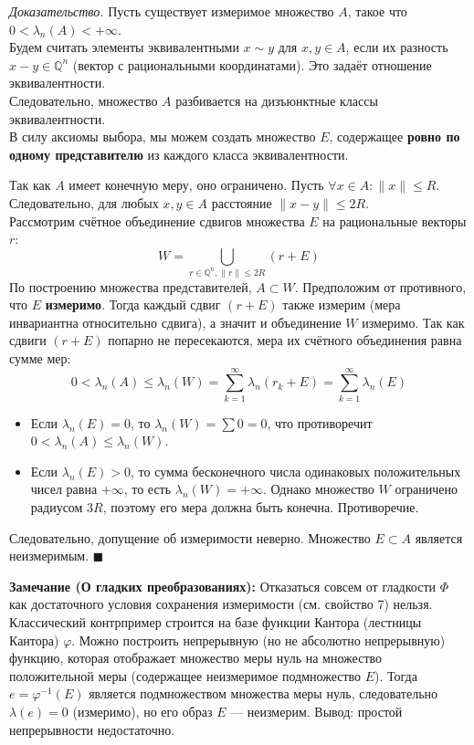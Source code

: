 \documentclass[12pt,a4paper]{article}
\newenvironment{Proof}[1][Доказательство]{\vspace{0.5em}\noindent\textit{#1.}\hspace{0.5em}\ignorespaces}{\hfill$\blacksquare$\vspace{1em}}
\begin{document}
\begin{Proof}
Пусть существует измеримое множество $A$, такое что $0 < \lambda_n(A) < +\infty$. \\
Будем считать элементы эквивалентными $x \sim y$ для $x, y \in A$, если их разность $x - y \in \mathbb{Q}^n$ (вектор с рациональными координатами). Это задаёт отношение эквивалентности. \\
Следовательно, множество $A$ разбивается на дизъюнктные классы эквивалентности. \\
В силу аксиомы выбора, мы можем создать множество $E$, содержащее \textbf{ровно по одному представителю} из каждого класса эквивалентности.

Так как $A$ имеет конечную меру, оно ограничено. Пусть $\forall x \in A : \|x\| \le R$. \\
Следовательно, для любых $x, y \in A$ расстояние $\|x - y\| \le 2R$. \\
Рассмотрим счётное объединение сдвигов множества $E$ на рациональные векторы $r$:
$$ W = \bigcup\limits_{r \in \mathbb{Q}^n, \|r\| \le 2R} (r + E) $$
По построению множества представителей, $A \subset W$. 
Предположим от противного, что $E$ \textbf{измеримо}. Тогда каждый сдвиг $(r + E)$ также измерим (мера инвариантна относительно сдвига), а значит и объединение $W$ измеримо.
Так как сдвиги $(r + E)$ попарно не пересекаются, мера их счётного объединения равна сумме мер:
$$ 0 < \lambda_n(A) \le \lambda_n(W) = \sum\limits_{k=1}^{\infty} \lambda_n(r_k + E) = \sum\limits_{k=1}^{\infty} \lambda_n(E) $$
\begin{itemize}
    \item Если $\lambda_n(E) = 0$, то $\lambda_n(W) = \sum 0 = 0$, что противоречит $0 < \lambda_n(A) \le \lambda_n(W)$.
    \item Если $\lambda_n(E) > 0$, то сумма бесконечного числа одинаковых положительных чисел равна $+\infty$, то есть $\lambda_n(W) = +\infty$. Однако множество $W$ ограничено радиусом $3R$, поэтому его мера должна быть конечна. Противоречие.
\end{itemize}
Следовательно, допущение об измеримости неверно. Множество $E \subset A$ является неизмеримым.
\end{Proof}

\noindent \textbf{Замечание (О гладких преобразованиях):} Отказаться совсем от гладкости $\Phi$ как достаточного условия сохранения измеримости (см. свойство 7) нельзя. Классический контрпример строится на базе функции Кантора (лестницы Кантора) $\varphi$. Можно построить непрерывную (но не абсолютно непрерывную) функцию, которая отображает множество меры нуль на множество положительной меры (содержащее неизмеримое подмножество $E$). Тогда $e = \varphi^{-1}(E)$ является подмножеством множества меры нуль, следовательно $\lambda(e) = 0$ (измеримо), но его образ $E$ — неизмерим. Вывод: простой непрерывности недостаточно.
\end{document}
